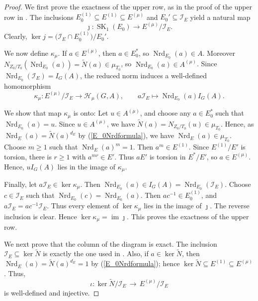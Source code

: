 \documentclass[11pt]{article}
\numberwithin{equation}{section}
\theoremstyle{plain}
\theoremstyle{remark}
\newcommand{\opn}{\operatorname}
\newcommand{\Nrd}{\opn{Nrd}}
\begin{document}
\begin{proof}
We first prove the exactness of the upper row, as in the proof of the
upper row in \cite[Th.~3.4]{hazrat-wadsworth-2011}.  The inclusions
$E_0^{(1)}\subseteq E^{(1)}\subseteq E^{(\mu)}$  and $E_0' \subseteq \mathcal I_E$ yield a natural map 
$$
\jmath\colon\operatorname{SK}_1(E_0)\longrightarrow E^{(\mu)}/\mathcal I_E.
$$
Clearly, $\opn{ker} j = \big(\mathcal I_E\cap E_0^{(1)}\big)\big/E_0' $.



We now define $\kappa_\mu$.  If $a\in E^{(\mu)}$, then $a\in E_0^*$, so
$\operatorname{Nrd}_{E_0}(a)\in A$.  Moreover 
$N_{Z_0/T_0}(\operatorname{Nrd}_{E_0}(a)) = \widetilde N(a)\in\mu_{T_0}$, 
so $\operatorname{Nrd}_{E_0}(a)\in A^{(\mu)}$.  Since
$\operatorname{Nrd}_{E_0}(\mathcal I_E)=I_{G}(A)$, the reduced norm
induces a well-defined homomorphism
$$
        \kappa_\mu:E^{(\mu)}/\mathcal I_E
        \longrightarrow
        \mathcal H_\mu(G,A),\qquad
        a\mathcal I_E\longmapsto
        \operatorname{Nrd}_{E_0}(a)I_{G}(A).
$$

We show that map $\kappa_\mu$ is onto:  Let $u\in A^{(\mu)}$, and  choose any 
$a\in E_0^*$ such that $\Nrd_{E_0}(a)=u$.  Since
$u\in A^{(\mu)}$, we have $\widetilde N(a)=N_{Z_0/T_0}(u)\in\mu_{T_0}$. Hence,
as  $\operatorname{Nrd}_E(a)=\widetilde N(a)^{d_E}$ by (\ref{E_0Nrdformula}), 
we have $\Nrd_E(a)\in \mu_{T_0}$.  Choose
$m\geq1$ such that $\operatorname{Nrd}_E(a)^m=1$.  Then
$a^m\in E^{(1)}$.  Since $E^{(1)}/E'$ is torsion, there is $r\geq1$
with $a^{mr}\in E'$.  Thus $aE'$ is torsion in $E^*/E'$, so
$a\in E^{(\mu)}$.  Hence, $uI_{G}(A)$ lies in the image of
$\kappa_\mu$.

Finally, let $a\mathcal I_E\in\ker\kappa_\mu$.  Then $\Nrd_{E_0}(a)\in I_{G}(A) = \Nrd_{E_0}(\mathcal I_E)$. 
Choose $c\in\mathcal I_E$ such that $\Nrd_{E_0}(c)=\Nrd_{E_0}(a)$. Then $ac^{-1}\in E_0^{(1)}$, and 
$a\mathcal I_E=ac^{-1}\mathcal I_E$. Thus every element of $\ker\kappa_\mu$ lies in the image of $\jmath$.
The reverse inclusion is clear.  Hence $\ker\kappa_\mu=\operatorname{im}\jmath$. 
This proves the exactness of the upper row.

We next prove that the  column of the diagram is exact.  The inclusion
$\mathcal I_E\subseteq\ker\widetilde N$ is exactly the one used in
\cite[Th.~3.4]{hazrat-wadsworth-2011}.  Also, if $a\in\ker\widetilde N$,
then $\operatorname{Nrd}_E(a)=\widetilde N(a)^{d_E}=1$ by (\ref{E_0Nrdformula}); hence
$\ker\widetilde N\subseteq E^{(1)}\subseteq E^{(\mu)}$.  Thus,
 $$
 \iota\colon \ker\widetilde N/\mathcal I_E\,\longrightarrow \,E^{(\mu)}/\mathcal I_E
 $$ 
 is well-defined and injective.


\end{proof}
\end{document}
